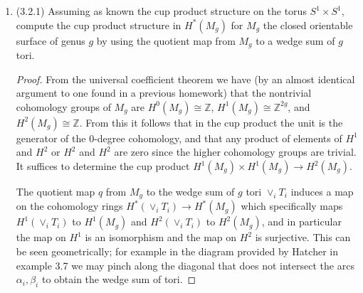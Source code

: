 \documentclass[11pt]{article}
\begin{document}
\begin{enumerate}
    \item (3.2.1) Assuming as known the cup product structure on the torus $S^1\times S^1$, compute the cup product structure in $H^\ast(M_g)$ for $M_g$ the closed orientable surface of genus $g$ by using the quotient map from $M_g$ to a wedge sum of $g$ tori. \begin{proof}
        From the universal coefficient theorem we have (by an almost identical argument to one found in a previous homework) that the nontrivial cohomology groups of $M_g$ are $H^0(M_g)\cong \mathbb{Z}$, $H^1(M_g)\cong \mathbb{Z}^{2g}$, and $H^2(M_g)\cong \mathbb{Z}$. From this it follows that in the cup product the unit is the generator of the $0$-degree cohomology, and that any product of elements of $H^1$ and $H^2$ or $H^2$ and $H^2$ are zero since the higher cohomology groups are trivial. It suffices to determine the cup product $H^1(M_g)\times H^1(M_g)\to H^2(M_g)$.

        The quotient map $q$ from $M_g$ to the wedge sum of $g$ tori $\vee_i T_i$ induces a map on the cohomology rings $H^\ast(\vee_i T_i)\to H^\ast(M_g)$ which specifically maps $H^1(\vee_i T_i)$ to $H^1(M_g)$ and $H^2(\vee_iT_i)$ to $H^2(M_g)$, and in particular the map on $H^1$ is an isomorphism and the map on $H^2$ is surjective. This can be seen geometrically; for example in the diagram provided by Hatcher in example 3.7 we may pinch along the diagonal that does not intersect the arcs $\alpha_i,\beta_i$ to obtain the wedge sum of tori. \vspace*{5cm}


\end{proof}
\end{enumerate}
\end{document}
